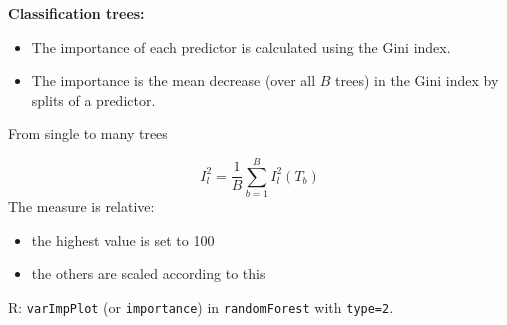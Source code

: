 \documentclass[
  ignorenonframetext,
]{beamer}
\providecommand{\tightlist}{%
  \setlength{\itemsep}{0pt}\setlength{\parskip}{0pt}}
\begin{document}
\begin{frame}

\textbf{Classification trees:}

\begin{itemize}
\tightlist
\item
  The importance of each predictor is calculated using the Gini index.
\item
  The importance is the mean decrease (over all \(B\) trees) in the Gini
  index by splits of a predictor.
\end{itemize}

\end{frame}

\begin{frame}[fragile]

\begin{block}{From single to many trees}

\[I_l^2=\frac{1}{B} \sum_{b=1}^B I_l^2(T_b)\] The measure is relative:

\begin{itemize}
\tightlist
\item
  the highest value is set to 100
\item
  the others are scaled according to this
\end{itemize}

R: \texttt{varImpPlot} (or \texttt{importance}) in \texttt{randomForest}
with \texttt{type=2}.

\end{block}

\end{frame}
\end{document}
